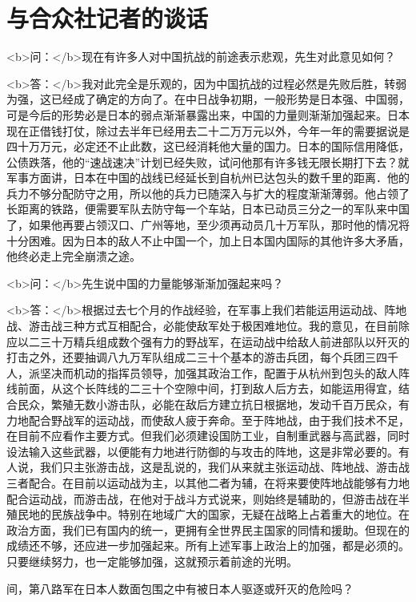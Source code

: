 \section[与合众社记者的谈话（一九三八年二月）]{与合众社记者的谈话}


<b>问：</b>现在有许多人对中国抗战的前途表示悲观，先生对此意见如何？

<b>答：</b>我对此完全是乐观的，因为中国抗战的过程必然是先败后胜，转弱为强，这已经成了确定的方向了。在中日战争初期，一般形势是日本强、中国弱，可是今后的形势必是日本的弱点渐渐暴露出来，中国的力量则渐渐加强起来。日本现在正借钱打仗，除过去半年已经用去二十二万万元以外，今年一年的需要据说是四十万万元，必定还不止此数，这已经消耗他大量的国力。日本的国际信用降低，公债跌落，他的“速战速决”计划已经失败，试问他那有许多钱无限长期打下去？就军事方面讲，日本在中国的战线已经延长到自杭州已达包头的数千里的距离．他的兵力不够分配防守之用，所以他的兵力已随深入与扩大的程度渐渐薄弱。他占领了长距离的铁路，便需要军队去防守每一个车站，日本已动员三分之一的军队来中国了，如果他再要占领汉口、广州等地，至少须再动员几十万军队，那时他的情况将十分困难。因为日本的敌人不止中国一个，加上日本国内国际的其他许多大矛盾，他终必走上完全崩溃之途。

<b>问：</b>先生说中国的力量能够渐渐加强起来吗？

<b>答：</b>根据过去七个月的作战经验，在军事上我们若能运用运动战、阵地战、游击战三种方式互相配合，必能使敌军处于极困难地位。我的意见，在目前除应以二三十万精兵组成数个强有力的野战军，在运动战中给敌人前进部队以歼灭的打击之外，还要抽调八九万军队组成二三十个基本的游击兵团，每个兵团三四千人，派坚决而机动的指挥员领导，加强其政治工作，配置于从杭州到包头的敌人阵线前面，从这个长阵线的二三十个空隙中间，打到敌人后方去，如能运用得宜，结合民众，繁殖无数小游击队，必能在敌后方建立抗日根据地，发动千百万民众，有力地配合野战军的运动战，而使敌人疲于奔命。至于阵地战，由于我们技术不足，在目前不应看作主要方式。但我们必须建设国防工业，自制重武器与高武器，同时设法输入这些武器，以便能有力地进行防御的与攻击的阵地，这是非常必要的。有人说，我们只主张游击战，这是乱说的，我们从来就主张运动战、阵地战、游击战三者配合。在目前以运动战为主，以其他二者为辅，在将来要使阵地战能够有力地配合运动战，而游击战，在他对于战斗方式说来，则始终是辅助的，但游击战在半殖民地的民族战争中。特别在地域广大的国家，无疑在战略上占着重大的地位。在政治方面，我们已有国内的统一，更拥有全世界民主国家的同情和援助。但现在的成绩还不够，还应进一步加强起来。所有上述军事上政治上的加强，都是必须的。只要继续努力，也一定能够加强，这就预示着前途的光明。

间，第八路军在日本人数面包围之中有被日本人驱逐或歼灭的危险吗？

